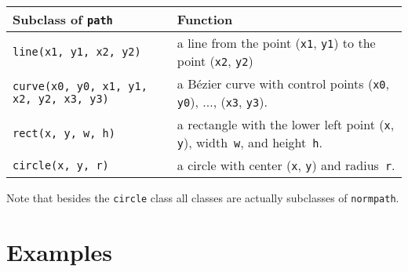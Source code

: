\medskip
\begin{tabularx}{\linewidth}{l>{\raggedright\arraybackslash}X}
Subclass of \texttt{path} & Function \\
\hline
\texttt{line(x1, y1, x2, y2)} & a line from the point
  (\texttt{x1}, \texttt{y1}) to the point (\texttt{x2}, \texttt{y2})\\
\texttt{curve(x0, y0, x1, y1, x2, y2, x3, y3)} & a B\'ezier curve with 
control points  (\texttt{x0}, \texttt{y0}), $\dots$, (\texttt{x3}, \texttt{y3}).\\
\texttt{rect(x, y, w, h)} &  a rectangle with the
  lower left point (\texttt{x}, \texttt{y}), width~\texttt{w}, and
  height~\texttt{h}. \\
\texttt{circle(x, y, r)} & a circle with 
  center (\texttt{x}, \texttt{y}) and radius~\texttt{r}.
\end{tabularx}
\medskip
Note that besides the \verb|circle| class all classes are actually
subclasses of \verb|normpath|.


\section{Examples}



